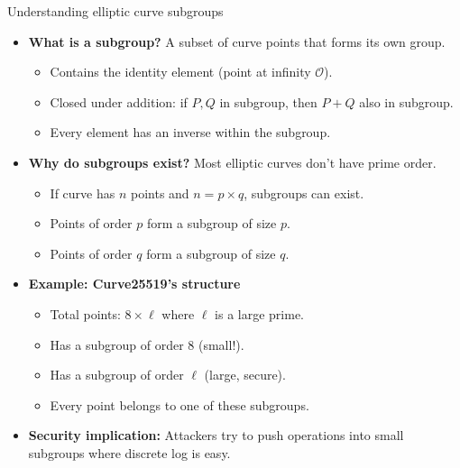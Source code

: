 \documentclass[aspectratio=169, lualatex, handout]{beamer}
\begin{document}
\begin{frame}{Understanding elliptic curve subgroups}
	\begin{itemize}
		\item \textbf{What is a subgroup?} A subset of curve points that forms its own group.
		      \begin{itemize}
			      \item Contains the identity element (point at infinity $\mathcal{O}$).
			      \item Closed under addition: if $P, Q$ in subgroup, then $P + Q$ also in subgroup.
			      \item Every element has an inverse within the subgroup.
		      \end{itemize}
		\item \textbf{Why do subgroups exist?} Most elliptic curves don't have prime order.
		      \begin{itemize}
			      \item If curve has $n$ points and $n = p \times q$, subgroups can exist.
			      \item Points of order $p$ form a subgroup of size $p$.
			      \item Points of order $q$ form a subgroup of size $q$.
		      \end{itemize}
		\item \textbf{Example: Curve25519's structure}
		      \begin{itemize}
			      \item Total points: $8 \times \ell$ where $\ell$ is a large prime.
			      \item Has a subgroup of order 8 (small!).
			      \item Has a subgroup of order $\ell$ (large, secure).
			      \item Every point belongs to one of these subgroups.
		      \end{itemize}
		\item \textbf{Security implication:} Attackers try to push operations into small subgroups where discrete log is easy.
	\end{itemize}
\end{frame}
\end{document}
